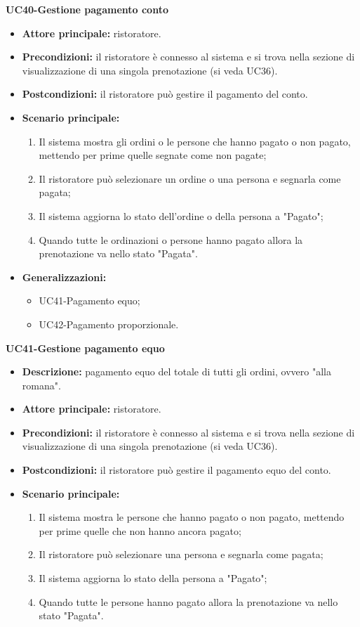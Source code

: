 \textbf{UC40-Gestione pagamento conto}  
\begin{itemize}
    \item \textbf{Attore principale:} ristoratore.
    \item \textbf{Precondizioni:} il ristoratore è connesso al sistema e si trova nella sezione di visualizzazione di una singola prenotazione (si veda UC36).
    \item \textbf{Postcondizioni:} il ristoratore può gestire il pagamento del conto.
    \item \textbf{Scenario principale:}
    \begin{enumerate}
        \item Il sistema mostra gli ordini o le persone che hanno pagato o non pagato, mettendo per prime quelle segnate come non pagate;
        \item Il ristoratore può selezionare un ordine o una persona e segnarla come pagata;
        \item Il sistema aggiorna lo stato dell'ordine o della persona a "Pagato";
        \item Quando tutte le ordinazioni o persone hanno pagato allora la prenotazione va nello stato "Pagata".
    \end{enumerate}
    \item \textbf{Generalizzazioni:}
        \begin{itemize}
            \item UC41-Pagamento equo;
            \item UC42-Pagamento proporzionale.
        \end{itemize}
\end{itemize}

\textbf{UC41-Gestione pagamento equo}  
\begin{itemize}
    \item \textbf{Descrizione:} pagamento equo del totale di tutti gli ordini, ovvero "alla romana".
    \item \textbf{Attore principale:} ristoratore.
    \item \textbf{Precondizioni:} il ristoratore è connesso al sistema e si trova nella sezione di visualizzazione di una singola prenotazione (si veda UC36).
    \item \textbf{Postcondizioni:} il ristoratore può gestire il pagamento equo del conto.
    \item \textbf{Scenario principale:}
    \begin{enumerate}
        \item Il sistema mostra le persone che hanno pagato o non pagato, mettendo per prime quelle che non hanno ancora pagato;
        \item Il ristoratore può selezionare una persona e segnarla come pagata;
        \item Il sistema aggiorna lo stato della persona a "Pagato";
        \item Quando tutte le persone hanno pagato allora la prenotazione va nello stato "Pagata".
    \end{enumerate}
\end{itemize}

